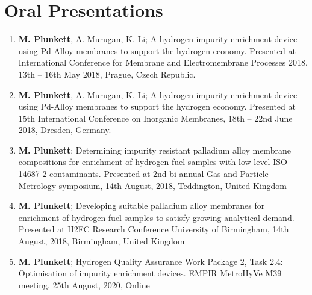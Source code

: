 \section*{Oral Presentations}
\begin{enumerate}
    \item \textbf{M. Plunkett}, A. Murugan, K. Li; A hydrogen impurity enrichment device using Pd-Alloy membranes to support the hydrogen economy. Presented at International Conference for Membrane and Electromembrane Processes 2018, 13th – 16th May 2018, Prague, Czech Republic.
    \item \textbf{M. Plunkett}, A. Murugan, K. Li; A hydrogen impurity enrichment device using Pd-Alloy membranes to support the hydrogen economy. Presented at 15th International Conference on Inorganic Membranes, 18th – 22nd June 2018, Dresden, Germany.
    \item \textbf{M. Plunkett}; Determining impurity resistant palladium alloy membrane compositions for enrichment of hydrogen fuel samples with low level ISO 14687-2 contaminants. Presented at 2nd bi-annual Gas and Particle Metrology symposium, 14th August, 2018, Teddington, United Kingdom
    \item \textbf{M. Plunkett}; Developing suitable palladium alloy membranes for enrichment of hydrogen fuel samples to satisfy growing analytical demand. Presented at H2FC Research Conference University of Birmingham, 14th August, 2018, Birmingham, United Kingdom
    \item \textbf{M. Plunkett}; Hydrogen Quality Assurance Work Package 2, Task 2.4: Optimisation of impurity enrichment devices. EMPIR MetroHyVe M39 meeting, 25th August, 2020, Online
\end{enumerate}



